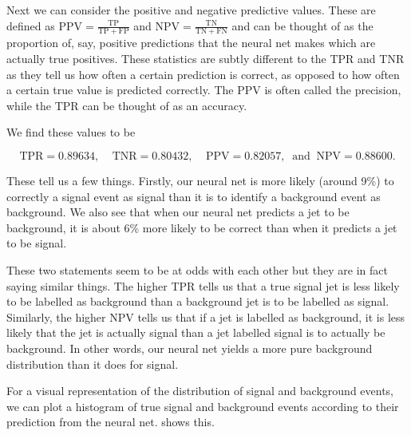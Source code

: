 \documentclass[11pt]{article}
\numberwithin{equation}{section}
\numberwithin{figure}{section}
\numberwithin{table}{section}
\begin{document}
Next we can consider the positive and negative predictive values. These are defined as $\mathrm{PPV}=\frac{\mathrm{TP}}{\mathrm{TP}+\mathrm{FP}}$ and $\mathrm{NPV}=\frac{\mathrm{TN}}{\mathrm{TN}+\mathrm{FN}}$ and can be thought of as the proportion of, say, positive predictions that the neural net makes which are actually true positives. These statistics are subtly different to the TPR and TNR as they tell us how often a certain prediction is correct, as opposed to how often a certain true value is predicted correctly. The PPV is often called the precision, while the TPR can be thought of as an accuracy. 

We find these values to be 

\begin{equation*}
    \mathrm{TPR}=0.89634,\;\;\;\; \mathrm{TNR}=0.80432,\;\;\;\; \mathrm{PPV}=0.82057,\;\;\mathrm{and}\;\; \mathrm{NPV}=0.88600.
\end{equation*}

These tell us a few things. Firstly, our neural net is more likely (around 9\%) to correctly a signal event as signal than it is to identify a background event as background. We also see that when our neural net predicts a jet to be background, it is about 6\% more likely to be correct than when it predicts a jet to be signal. 

These two statements seem to be at odds with each other but they are in fact saying similar things. The higher TPR tells us that a true signal jet is less likely to be labelled as background than a background jet is to be labelled as signal. Similarly, the higher NPV tells us that if a jet is labelled as background, it is less likely that the jet is actually signal than a jet labelled signal is to actually be background. In other words, our neural net yields a more pure background distribution than it does for signal. 

For a visual representation of the distribution of signal and background events, we can plot a histogram of true signal and background events according to their prediction from the neural net.  shows this. 
\end{document}
